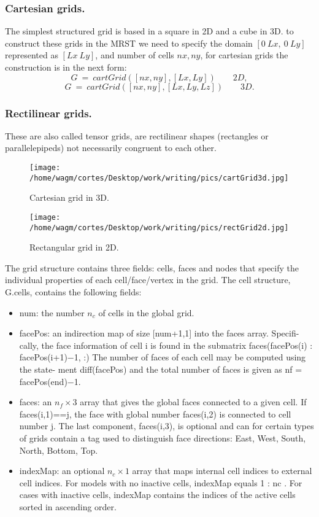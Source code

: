 \documentclass[12pt]{report}
\begin{document}
\subsubsection{Cartesian grids.}
The simplest structured grid is based in a square in 2D and a cube in 3D. to construct these
grids in the MRST we need to specify the domain $[0\: Lx,\: 0\: Ly]$ represented as $[Lx\: Ly]$, and
number of cells $nx, ny$, for cartesian grids the construction is in the next form:\\
$$
G\:=\:cartGrid([nx,ny],[Lx,Ly]) \qquad 2D, $$
$$G\:=\:cartGrid([nx,ny],[Lx,Ly,Lz]) \qquad 3D.
$$



\subsubsection{Rectilinear grids.}
These are also called tensor grids, are rectilinear shapes (rectangles or parallelepipeds) not necessarily 
congruent to each other.\\
\begin{figure}[h!]
\centering
\begin{minipage}{.6\textwidth}
 \centering
\texttt{[image: /home/wagm/cortes/Desktop/work/writing/pics/cartGrid3d.jpg]}
\caption{Cartesian grid in 3D.}
\label{fig:Cartgrid3D}
\end{minipage}%
\begin{minipage}{.5\textwidth}
\centering
\texttt{[image: /home/wagm/cortes/Desktop/work/writing/pics/rectGrid2d.jpg]}
\caption{Rectangular grid in 2D.}
\label{fig:Rectgrid2D}
\end{minipage}
\end{figure}
The grid structure contains three fields: cells, faces and nodes that specify the individual properties of
each cell/face/vertex in the grid.
The cell structure, G.cells, contains the following fields:
\begin{itemize}
 \item num: the number $n_c$ of cells in the global grid.
\item facePos: an indirection map of size [num+1,1] into the faces array. Specifi-
cally, the face information of cell i is found in the submatrix
faces(facePos(i) : facePos(i+1)−1, :)
The number of faces of each cell may be computed using the state-
ment diff(facePos) and the total number of faces is given as nf =
facePos(end)−1.
\item  faces: an $n_f\times3$ array that gives the global faces connected to a given cell.
If faces(i,1)==j, the face with global number faces(i,2) is
connected to cell number j. The last component, faces(i,3), is optional
and can for certain types of grids contain a tag used to distinguish face
directions: East, West, South, North, Bottom, Top.
\item indexMap: an optional $n_c \times 1$ array that maps internal cell indices to external
cell indices. For models with no inactive cells, indexMap equals 1 : nc . For
cases with inactive cells, indexMap contains the indices of the active cells
sorted in ascending order. 
\end{itemize}
\end{document}
